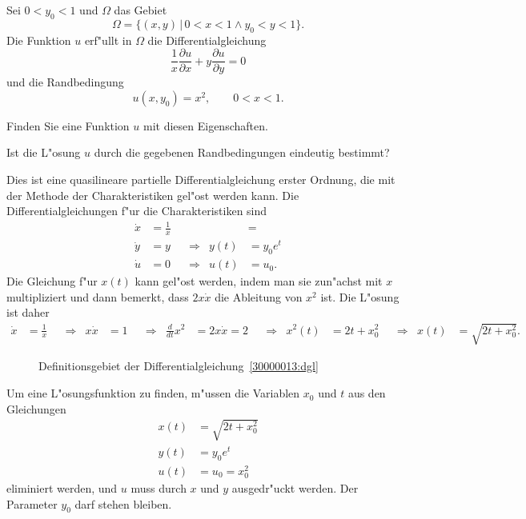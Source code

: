 Sei $0 < y_0 < 1$ und $\Omega$ das Gebiet
\[
\Omega=\{ (x,y)\,|\, 0<x<1\wedge y_0 < y < 1\}.
\]
Die Funktion $u$ erf"ullt in $\Omega$ die Differentialgleichung
\begin{equation}
\frac1x \frac{\partial u}{\partial x}
+
y\frac{\partial u}{\partial y}
=
0
\label{30000012:dgl}
\end{equation}
und die Randbedingung 
\[
u(x,y_0)=x^2,\qquad 0<x<1.
\]
\begin{teilaufgaben}
\item
Finden Sie eine Funktion $u$ mit diesen Eigenschaften.
\item
Ist die L"osung $u$ durch die gegebenen Randbedingungen eindeutig bestimmt?
\end{teilaufgaben}

\begin{loesung}
Dies ist eine quasilineare partielle Differentialgleichung erster Ordnung,
die mit der Methode der Charakteristiken gel"ost werden kann.
Die Differentialgleichungen f"ur die Charakteristiken sind
\[
\begin{aligned}
\dot x &= \frac1x &&           &        &=         \\
\dot y &=       y &&\Rightarrow&   y(t) &= y_0 e^t \\
\dot u &= 0       &&\Rightarrow&   u(t) &= u_0.
\end{aligned}
\]
Die Gleichung f"ur $x(t)$ kann gel"ost werden, indem man sie zun"achst mit
$x$ multipliziert und dann bemerkt, dass $2x\dot x$ die Ableitung von $x^2$
ist.
Die L"osung ist daher
\begin{align*}
\dot x &= \frac1x
&&\Rightarrow&
x\dot x &= 1
&&\Rightarrow&
\frac{d}{dt}x^2&=2x\dot x=2
&&\Rightarrow&
x^2(t) &= 2t + x_0^2
&&\Rightarrow&
x(t)&=\sqrt{2t+x_0^2}.
\end{align*}
\begin{figure}
\centering
{}
\caption{Definitionsgebiet der Differentialgleichung~\ref{30000013:dgl}
\label{30000013:domain}}
\end{figure}
\begin{teilaufgaben}
\item
Um eine L"osungsfunktion zu finden, m"ussen die Variablen $x_0$ und $t$ aus den
Gleichungen
\begin{align*}
x(t)&=\sqrt{2t+x_0^2}\\
y(t) &= y_0e^t\\
u(t)&=u_0 = x_0^2
\end{align*}
eliminiert werden, und $u$ muss durch $x$ und $y$ ausgedr"uckt werden.
Der Parameter $y_0$ darf stehen bleiben.


\end{teilaufgaben}
\end{loesung}
